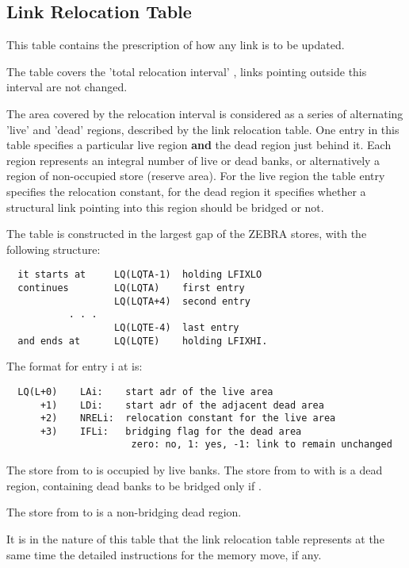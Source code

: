\subsection*{Link Relocation Table}

This table contains the prescription of how any link is to be
updated.

The table covers the 'total relocation interval'
,
links pointing outside this interval are not changed.

The area covered by the relocation interval is considered as a
series of alternating 'live' and 'dead' regions,
described by the link relocation table.
One entry in this table specifies a particular live region
\textbf{and}
the dead region just behind it.
Each region represents an integral number of live or dead banks,
or alternatively a region of non-occupied store (reserve area).
For the live region the table entry specifies the relocation
constant, for the dead region it specifies whether a structural link
pointing into this region should be bridged or not.

The table is constructed in the largest gap of the ZEBRA stores,
with the following structure:

\begin{verbatim}
  it starts at     LQ(LQTA-1)  holding LFIXLO
  continues        LQ(LQTA)    first entry
                   LQ(LQTA+4)  second entry
           . . .
                   LQ(LQTE-4)  last entry
  and ends at      LQ(LQTE)    holding LFIXHI.

\end{verbatim} 
The format for entry i at   is:

\begin{verbatim}
  LQ(L+0)    LAi:    start adr of the live area
      +1)    LDi:    start adr of the adjacent dead area
      +2)    NRELi:  relocation constant for the live area
      +3)    IFLi:   bridging flag for the dead area
                      zero: no, 1: yes, -1: link to remain unchanged
\end{verbatim} 

The store from  to  is occupied
by live banks.
The store from  to  with 
is a dead region,
containing dead banks to be bridged only if  .

The store from  to 
is a non-bridging dead region.

It is in the nature of this table that the link relocation table
represents at the same time the detailed instructions for
the memory move, if any.

